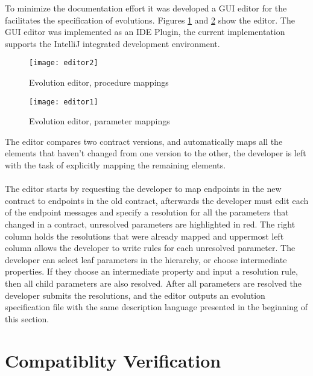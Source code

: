 To minimize the documentation effort it was developed a GUI editor for the facilitates the specification of evolutions.
Figures \ref{fig:editor1} and \ref{fig:editor2} show the editor.
The GUI editor was implemented as an IDE Plugin, the current implementation supports the IntelliJ integrated development environment.

\begin{figure}[htbp]
    \centering
    \centerline{\texttt{[image: editor2]}}
    \caption{Evolution editor, procedure mappings}
    \label{fig:editor1}
\end{figure}

\begin{figure}[htbp]
    \centering
    \centerline{\texttt{[image: editor1]}}
    \caption{Evolution editor, parameter mappings}
    \label{fig:editor2}
\end{figure}

The editor compares two contract versions,
and automatically maps all the elements that haven't changed from one version to the other, the
developer is left with the task of explicitly mapping the remaining elements.

\paragraph{}

The editor starts by requesting the developer to map endpoints in the new contract to endpoints in the old contract,
afterwards the developer must edit each of the endpoint messages and specify a resolution for all the parameters that changed
in a contract, unresolved parameters are highlighted in red.
The right column holds the resolutions that were already mapped and uppermost left column allows the developer to write rules
for each unresolved parameter.
The developer can select leaf parameters in the hierarchy, or choose intermediate properties.
If they choose an intermediate property and input a resolution rule, then all child parameters are also resolved.
After all parameters are resolved the developer submits the resolutions, and
the editor outputs an evolution specification file with the same description language presented in the beginning of this section.

\section{Compatiblity Verification} %
\label{sec:compatiblity_verification}


